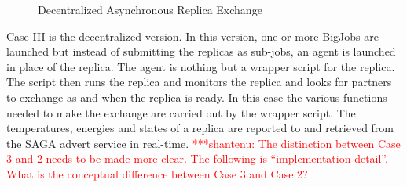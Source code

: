 \documentclass[a4paper,10pt]{article}
\newcommand{\jhanote}[1]{ {\textcolor{red} { ***shantenu: #1 }}}
\newcommand{\jhanote}[1]{}
\begin{document}
\begin{figure}
\centering


\caption{\small Decentralized Asynchronous Replica Exchange}
\label{fig:decentralized}
\end{figure}

Case III is the decentralized version. In this version, one or more BigJobs are launched but instead of submitting the replicas as sub-jobs, an agent is launched in place of the replica. The agent is nothing but a wrapper script for the replica. The script then runs the replica and monitors the replica and looks for partners to exchange as and when the replica is ready. In this case the various functions needed to make the exchange are carried out by the wrapper script. The temperatures, energies and states of a replica are reported to and retrieved from the SAGA advert service in real-time.
\jhanote{The distinction between
  Case 3 and 2 needs to be made more clear. The following is
  ``implementation detail''. What is the conceptual difference between
  Case 3 and Case 2?} 
\end{document}
